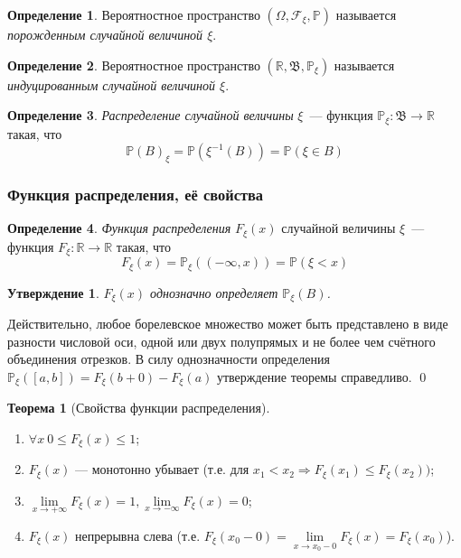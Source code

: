 \documentclass[oneside,final,14pt]{extreport}
\newcommand\myprob[1]{{\mathbb{P}(#1)}}
\renewenvironment{proof}{{\bfseries Доказательство.}}{\qed}
\theoremstyle{plain}
\newtheorem*{thm*}{Утверждение}
\theoremstyle{definition}
\newtheorem*{defn}{Определение}
\theoremstyle{named}
\newtheorem*{namedthm}{Теорема}
\begin{document}
\begin{defn}
    Вероятностное пространство $(\Omega,\mathcal{F}_\xi,\mathbb{P})$ называется {\it порожденным случайной величиной $\xi$}.
\end{defn}

\begin{defn}
    Вероятностное пространство $(\mathbb{R}, \mathfrak{B}, \mathbb{P}_\xi)$ называется {\it индуцированным случайной величиной $\xi$}.
\end{defn}

\begin{defn}
    {\it Распределение случайной величины} $\xi$~--- функция $\mathbb{P}_\xi: \mathfrak{B} \rightarrow \mathbb{R}$ такая, что
    \begin{equation*}
        \myprob{B}_\xi = \myprob{\xi^{-1}(B)} = \myprob{\xi \in B}
    \end{equation*}
\end{defn}
\subsubsection{Функция распределения, её свойства}
\begin{defn}
    {\it Функция распределения} $F_\xi (x)$ случайной величины $\xi$~--- функция $F_\xi: \mathbb{R} \rightarrow \mathbb{R}$ такая, что
    \begin{equation*}
        F_{\xi}(x)=\mathbb{P}_{\xi}((-\infty, x))=\mathbb{P}(\xi<x)
    \end{equation*}
\end{defn}

\begin{thm*}
    $F_\xi(x)$ однозначно определяет $\mathbb{P}_\xi(B)$.
\end{thm*}
\begin{proof}
    Действительно, любое борелевское множество может быть представлено в виде разности числовой оси, одной или двух полупрямых и не более чем счётного объединения отрезков. В силу однозначности определения $\mathbb{P}_\xi([a,b]) = F_\xi(b + 0) - F_\xi(a)$ утверждение теоремы справедливо.
\end{proof}

\begin{namedthm}[Свойства функции распределения]\leavevmode
\begin{enumerate}
    \item $\forall x~ 0 \leqslant F_\xi(x) \leqslant 1$;
    \item $F_\xi(x)$ --- монотонно убывает (т.е. для $x_1 < x_2 \Rightarrow F_\xi(x_1) \leqslant F_\xi(x_2))$;
    \item $\lim\limits_{x \rightarrow +\infty} F_\xi(x) = 1, \lim\limits_{x \rightarrow -\infty} F_\xi(x) = 0$;
    \item $F_\xi(x)$ непрерывна слева (т.е. $F_\xi(x_0 - 0) = \lim\limits_{x \rightarrow x_0 - 0}F_\xi(x) = F_\xi(x_0)$).
\end{enumerate}
\end{namedthm}
\end{document}
